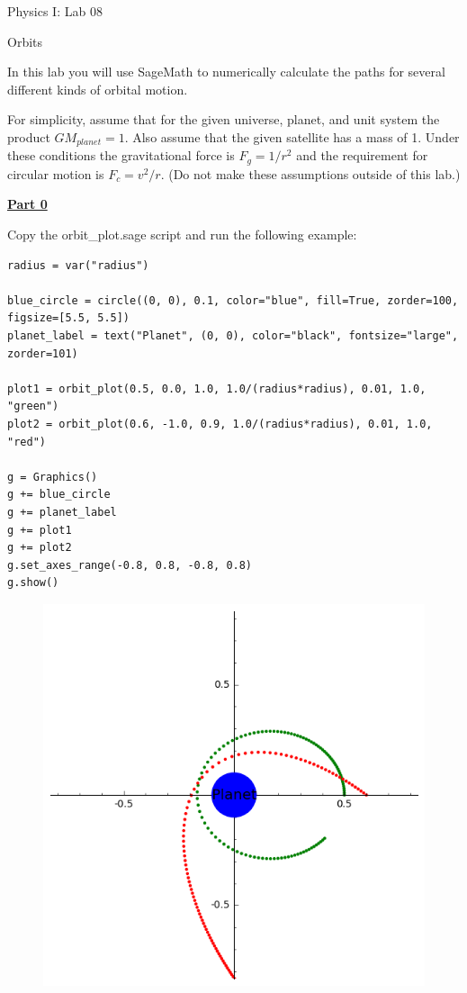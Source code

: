 \documentclass[12pt]{article}
\begin{document}
{\centering
\large Physics I: Lab 08 \par
\large Orbits \par
}
\hfill \break \vspace{-4mm}

In this lab you will use SageMath to numerically calculate the paths for several different kinds of orbital motion.
\hfill \break

For simplicity, assume that for the given universe, planet, and unit system the product $GM_{planet} = 1$.
Also assume that the given satellite has a mass of 1.
Under these conditions the gravitational force is $F_g = 1/r^2$ and the requirement for circular motion is $F_c = v^2/r$.
(Do not make these assumptions outside of this lab.)
\hfill \break

\underline{\textbf{Part 0}} \par
Copy the orbit\_plot.sage script and run the following example:
\begin{verbatim}
radius = var("radius")

blue_circle = circle((0, 0), 0.1, color="blue", fill=True, zorder=100, figsize=[5.5, 5.5])
planet_label = text("Planet", (0, 0), color="black", fontsize="large", zorder=101)

plot1 = orbit_plot(0.5, 0.0, 1.0, 1.0/(radius*radius), 0.01, 1.0, "green")
plot2 = orbit_plot(0.6, -1.0, 0.9, 1.0/(radius*radius), 0.01, 1.0, "red")

g = Graphics()
g += blue_circle
g += planet_label
g += plot1
g += plot2
g.set_axes_range(-0.8, 0.8, -0.8, 0.8)
g.show()
\end{verbatim}
%
\begin{figure}[H]
\includegraphics[scale=0.60]{figures/part0.png}
\end{figure}
\end{document}
